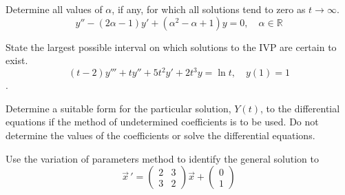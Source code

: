 \documentclass[12pt]{exam}
\begin{document}
\begin{questions}
    \newpage \InitialsRight
    
    \question[2] Determine all values of $\alpha$, if any, for which all solutions tend to zero as $t\to\infty$. $$y'' - (2\alpha - 1) y' + (\alpha^2-\alpha+1) y = 0, \quad \alpha \in \mathbb R$$ \vspace{5cm}  %
    
    
    \question[2] %
    State the largest possible interval on which solutions to the IVP are certain to exist. $$(t-2)y'''+ty''+5t^2y'+2t^3y = \ln t, \quad y(1) = 1$$.
    \vspace{3cm}
    

    \newpage \InitialsLeft
    \question[7]  Determine a suitable form for the particular solution, $Y(t)$, to the differential equations if the method of undetermined coefficients is to be used. Do not determine the values of the coefficients or solve the differential equations. 
    


    \newpage \InitialsRight
    \question[10] Use the variation of parameters method to identify the general solution to \[\vec{x} \, ' = \left( \begin{array}{rr} 2 & 3 \\ 3 & 2 \end{array} \right) \vec{x}  + \left( \begin{array}{r}  0\\ 1\end{array} \right)  \]

    
    
\end{questions}
    
\newpage \InitialsLeft 
\Scratch

\newpage \LastPage 
\end{document}
